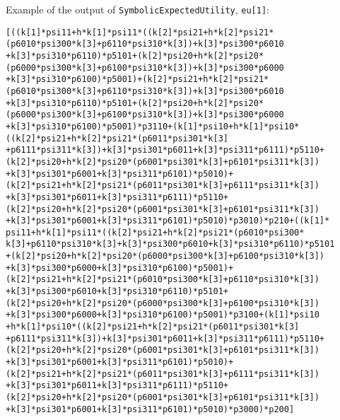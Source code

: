 \noindent Example of the output of \verb|SymbolicExpectedUtility|, \verb|eu[1]|:
\begin{alltt}
[((k[1]*psi11+h*k[1]*psi11*((k[2]*psi21+h*k[2]*psi21*
(p6010*psi300*k[3]+p6110*psi310*k[3])+k[3]*psi300*p6010
+k[3]*psi310*p6110)*p5101+(k[2]*psi20+h*k[2]*psi20*
(p6000*psi300*k[3]+p6100*psi310*k[3])+k[3]*psi300*p6000
+k[3]*psi310*p6100)*p5001)+(k[2]*psi21+h*k[2]*psi21*
(p6010*psi300*k[3]+p6110*psi310*k[3])+k[3]*psi300*p6010
+k[3]*psi310*p6110)*p5101+(k[2]*psi20+h*k[2]*psi20*
(p6000*psi300*k[3]+p6100*psi310*k[3])+k[3]*psi300*p6000
+k[3]*psi310*p6100)*p5001)*p3110+(k[1]*psi10+h*k[1]*psi10*
((k[2]*psi21+h*k[2]*psi21*(p6011*psi301*k[3]
+p6111*psi311*k[3])+k[3]*psi301*p6011+k[3]*psi311*p6111)*p5110+
(k[2]*psi20+h*k[2]*psi20*(p6001*psi301*k[3]+p6101*psi311*k[3])
+k[3]*psi301*p6001+k[3]*psi311*p6101)*p5010)+
(k[2]*psi21+h*k[2]*psi21*(p6011*psi301*k[3]+p6111*psi311*k[3])
+k[3]*psi301*p6011+k[3]*psi311*p6111)*p5110+
(k[2]*psi20+h*k[2]*psi20*(p6001*psi301*k[3]+p6101*psi311*k[3])
+k[3]*psi301*p6001+k[3]*psi311*p6101)*p5010)*p3010)*p210+((k[1]*
psi11+h*k[1]*psi11*((k[2]*psi21+h*k[2]*psi21*(p6010*psi300*
k[3]+p6110*psi310*k[3]+k[3]*psi300*p6010+k[3]*psi310*p6110)*p5101
+(k[2]*psi20+h*k[2]*psi20*(p6000*psi300*k[3]+p6100*psi310*k[3])
+k[3]*psi300*p6000+k[3]*psi310*p6100)*p5001)+
(k[2]*psi21+h*k[2]*psi21*(p6010*psi300*k[3]+p6110*psi310*k[3])
+k[3]*psi300*p6010+k[3]*psi310*p6110)*p5101+
(k[2]*psi20+h*k[2]*psi20*(p6000*psi300*k[3]+p6100*psi310*k[3])
+k[3]*psi300*p6000+k[3]*psi310*p6100)*p5001)*p3100+(k[1]*psi10
+h*k[1]*psi10*((k[2]*psi21+h*k[2]*psi21*(p6011*psi301*k[3]
+p6111*psi311*k[3])+k[3]*psi301*p6011+k[3]*psi311*p6111)*p5110+
(k[2]*psi20+h*k[2]*psi20*(p6001*psi301*k[3]+p6101*psi311*k[3])
+k[3]*psi301*p6001+k[3]*psi311*p6101)*p5010)+
(k[2]*psi21+h*k[2]*psi21*(p6011*psi301*k[3]+p6111*psi311*k[3])
+k[3]*psi301*p6011+k[3]*psi311*p6111)*p5110+
(k[2]*psi20+h*k[2]*psi20*(p6001*psi301*k[3]+p6101*psi311*k[3])
+k[3]*psi301*p6001+k[3]*psi311*p6101)*p5010)*p3000)*p200]
\end{alltt}
